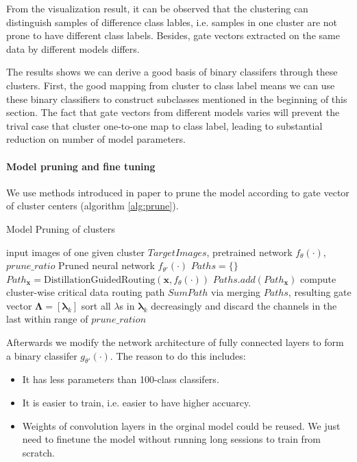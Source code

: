 \documentclass[sigplan,10pt,review]{acmart}\settopmatter{printfolios=true,printccs=false,printacmref=false}
\begin{document}
From the visualization result, it can be observed that the clustering can distinguish samples of difference class lables, i.e. samples in one cluster are not prone to have different class labels. Besides, gate vectors extracted on the same data by different models differs.

The results shows we can derive a good basis of binary classifers through these clusters. First, the good mapping from cluster to class label means we can use these binary classifiers to construct subclasses mentioned in the beginning of this section. The fact that gate vectors from different models varies will prevent the trival case that cluster one-to-one map to class label, leading to substantial reduction on number of model parameters.

\paragraph{Model pruning and fine tuning}

We use methods introduced in paper \cite{LiDongYue} to prune the model according to gate vector of cluster centers (algorithm \ref{alg:prune}).

\begin{algorithm}
	\caption{Model Pruning of clusters}
	\label{alg:prune}
	\begin{algorithmic}[1]
		\Require input images of one given cluster $TargetImages$, pretrained network $f_\theta(\cdot)$, $prune\_ratio$
		\Ensure Pruned neural network $f_{\theta'}(\cdot)$
		\State $Paths = \{\}$
			\State $Path_{\boldsymbol{x}} = \mathrm{DistillationGuidedRouting}(\boldsymbol{x}, f_\theta(\cdot))$
			\State $Paths.add(Path_{\boldsymbol{x}})$
		\EndFor		
		\State compute cluster-wise critical data routing path $SumPath$ via merging $Paths$, resulting gate vector $\boldsymbol{\Lambda} = [\boldsymbol{\lambda}_k]$
			\State sort all $\lambda$s in $\boldsymbol{\lambda}_k$ decreasingly and discard the channels in the last within range of $prune\_ration$
		\EndFor
	\end{algorithmic}
\end{algorithm}

Afterwards we modify the network architecture of fully connected layers to form a binary classifer $g_{\theta'}(\cdot)$. The reason to do this includes:
\begin{itemize}
	\item It has less parameters than 100-class classifers.
	\item It is easier to train, i.e. easier to have higher accuarcy.
	\item Weights of convolution layers in the orginal model could be reused. We just need to finetune the model without running long sessions to train from scratch.
\end{itemize} 
\end{document}
